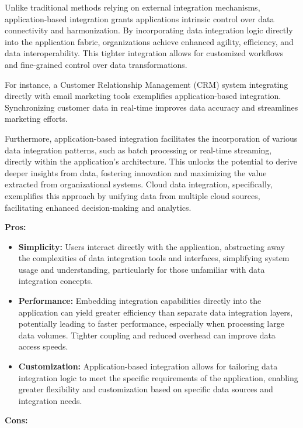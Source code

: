\documentclass[12pt]{book}
\begin{document}
Unlike traditional methods relying on external integration mechanisms, application-based integration grants applications intrinsic control over data connectivity and harmonization. By incorporating data integration logic directly into the application fabric, organizations achieve enhanced agility, efficiency, and data interoperability. This tighter integration allows for customized workflows and fine-grained control over data transformations.

For instance, a Customer Relationship Management (CRM) system integrating directly with email marketing tools exemplifies application-based integration. Synchronizing customer data in real-time improves data accuracy and streamlines marketing efforts.

Furthermore, application-based integration facilitates the incorporation of various data integration patterns, such as batch processing or real-time streaming, directly within the application's architecture. This unlocks the potential to derive deeper insights from data, fostering innovation and maximizing the value extracted from organizational systems. Cloud data integration, specifically, exemplifies this approach by unifying data from multiple cloud sources, facilitating enhanced decision-making and analytics.

\textbf{Pros:}

\begin{itemize}
    \item \textbf{Simplicity:} Users interact directly with the application, abstracting away the complexities of data integration tools and interfaces, simplifying system usage and understanding, particularly for those unfamiliar with data integration concepts.
    \item \textbf{Performance:} Embedding integration capabilities directly into the application can yield greater efficiency than separate data integration layers, potentially leading to faster performance, especially when processing large data volumes. Tighter coupling and reduced overhead can improve data access speeds.
    \item \textbf{Customization:} Application-based integration allows for tailoring data integration logic to meet the specific requirements of the application, enabling greater flexibility and customization based on specific data sources and integration needs.
\end{itemize}

\textbf{Cons:}
\end{document}
